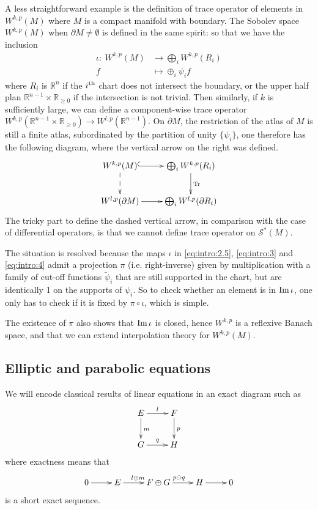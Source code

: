 A less straightforward example is the definition of trace operator of elements in \(W^{k,p}(M)\) where \(M\) is a compact manifold with boundary. The Sobolev space \(W^{k,p}(M)\) when \(\partial M\ne \emptyset\) is defined in the same spirit: so that we
have the inclusion
\begin{align}
\label{eq:intro:4}
  \iota:\  W^{k,p}(M) &\longrightarrow \bigoplus_i W^{k,p}(R_i) \\
  	  f &\longmapsto \oplus_i \psi_i f \nonumber
\end{align}
where \(R_i\) is \(\mathbb{R}^n\) if the \(i^{\rm th}\) chart does not intersect the
boundary, or the upper half plan \(\mathbb{R}^{n-1}\times \mathbb{R}_{\geq 0}\) if the
intersection is not trivial. Then similarly, if \(k\) is sufficiently large, we can
define a component-wise trace operator \(W^{k,p}(\mathbb{R}^{n-1}\times \mathbb{R}_{\geq
0}) \longrightarrow W^{l,p}(\mathbb{R}^{n-1})\). On \(\partial M\), the
restriction of the atlas of \(M\) is still a finite atlas, subordinated by the partition
of unity \(\{\psi_i\}\), one therefore has the following diagram, where the vertical
arrow on the right was defined.
\[
\xymatrix{
W^{k,p}(M) \ar@{^{(}->}[r] \ar@{-->}[d] & \bigoplus_i W^{k,p}(R_i) \ar@{->}[d]^{\rm Tr} \\
W^{l,p}(\partial M) \ar@{->}[r] & \bigoplus_i W^{l,p}(\partial R_i)
}
\]
The tricky part to define the dashed vertical arrow, in comparison with the case of
differential operators, is that we cannot define trace operator on \(\mathcal{S}^*(M)\).

The situation is resolved because the maps \(\iota\) in \eqref{eq:intro:2.5}, \eqref{eq:intro:3} and
\eqref{eq:intro:4} admit a projection \(\pi\) (i.e. right-inverse) given by multiplication with a
family of cut-off functions \(\tilde\psi_i\) that are still supported in the chart,
but are identically 1 on the supports of \(\psi_i\). So to check whether an element is
in \(\mathop{\rm Im}\nolimits \iota\), one only has to check if it is fixed by \(\pi\circ\iota\), which is
simple.

The existence of \(\pi\) also shows that \(\mathop{\rm Im}\nolimits\iota\) is closed, hence \(W^{k,p}\)
is a reflexive Banach space, and that we can extend interpolation theory for \(W^{k,p}(M)\).

\subsection{Elliptic and parabolic equations}
\label{sec:org780a3df}
We will encode classical results of linear equations in an exact diagram such as
\begin{equation}
\label{eq:intro:5}
\xymatrix{
E \ar@{->}[r]^{l} \ar@{->}[d]^{m} & F \ar@{->}[d]^{p} \\
G \ar@{->}[r]^{q} & H
}
\end{equation}
where exactness means that
\[
 \xymatrix{
0 \ar@{->}[r] & E \ar@{->}[r]^{l\oplus m} & F\oplus G \ar@{->}[r]^{p\ominus q} & H \ar@{->}[r] & 0
}
\]
is a short exact sequence.

